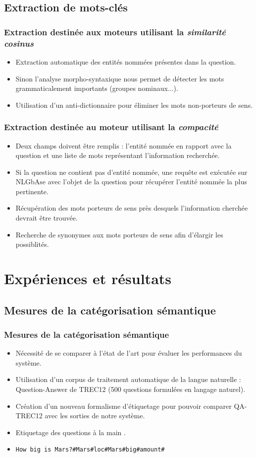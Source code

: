 \documentclass[xcolor=dvipsnames]{beamer}
\begin{document}
\subsection{Extraction de mots-clés}
\frame
{
    \frametitle{Extraction destinée aux moteurs utilisant la \textit{similarité cosinus}}
    \begin{itemize}
      \item<1-> Extraction automatique des entités nommées présentes dans la question.
      \item<2-> Sinon l'analyse morpho-syntaxique nous permet de détecter les mots \og grammaticalement importants \fg (groupes nominaux...). 
      \item<3-> Utilisation d'un anti-dictionnaire pour éliminer les mots non-porteurs de sens.
    \end{itemize}
}
\frame
{
    \frametitle{Extraction destinée au moteur utilisant la \textit{compacité}}
    \begin{itemize}
      \item<1-> Deux champs doivent être remplis : l'entité nommée en rapport avec la question et une liste de mots représentant l'information recherchée.
      \item<2-> Si la question ne contient pas d'entité nommée, une requête est exécutée sur NLGbAse avec l'objet de la question pour récupérer l'entité nommée la plus pertinente.
      \item<3-> Récupération des mots porteurs de sens près desquels l'information cherchée devrait être trouvée. 
      \item<4-> Recherche de synonymes aux mots porteurs de sens afin d'élargir les possiblités. 
    \end{itemize}
}

\section{Expériences et résultats}
\subsection{Mesures de la catégorisation sémantique}
\frame
{
    \frametitle{Mesures de la catégorisation sémantique}
    \begin{itemize}
      \item<1-> Nécessité de se comparer à l'état de l'art pour évaluer les performances du système.
      \item<2-> Utilisation d'un corpus de traitement automatique de la langue naturelle : Question-Answer de TREC12 (500 questions formulées en langage naturel).
      \item<3-> Création d'un nouveau formalisme d'étiquetage pour pouvoir comparer QA-TREC12 avec les sorties de notre système.
      \item<4-> Etiquetage des questions \og à la main \fg.
      \item<5-> \texttt{How big is Mars?\#Mars\#loc\#Mars\#big\#amount\#}
    \end{itemize}
}
\end{document}
